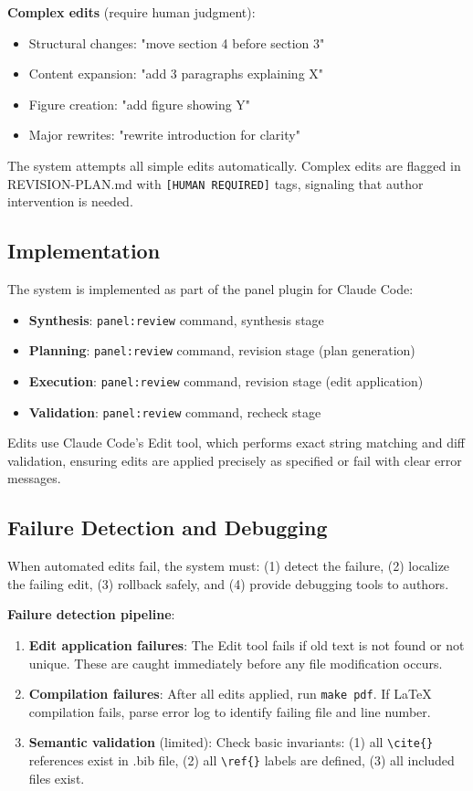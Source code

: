 \textbf{Complex edits} (require human judgment):
\begin{itemize}
\item Structural changes: "move section 4 before section 3"
\item Content expansion: "add 3 paragraphs explaining X"
\item Figure creation: "add figure showing Y"
\item Major rewrites: "rewrite introduction for clarity"
\end{itemize}

The system attempts all simple edits automatically. Complex edits are flagged in REVISION-PLAN.md with \texttt{[HUMAN REQUIRED]} tags, signaling that author intervention is needed.

\subsection{Implementation}

The system is implemented as part of the panel plugin for Claude Code:

\begin{itemize}
\item \textbf{Synthesis}: \texttt{panel:review} command, synthesis stage
\item \textbf{Planning}: \texttt{panel:review} command, revision stage (plan generation)
\item \textbf{Execution}: \texttt{panel:review} command, revision stage (edit application)
\item \textbf{Validation}: \texttt{panel:review} command, recheck stage
\end{itemize}

Edits use Claude Code's Edit tool, which performs exact string matching and diff validation, ensuring edits are applied precisely as specified or fail with clear error messages.

\subsection{Failure Detection and Debugging}

When automated edits fail, the system must: (1) detect the failure, (2) localize the failing edit, (3) rollback safely, and (4) provide debugging tools to authors.

\textbf{Failure detection pipeline}:
\begin{enumerate}
\item \textbf{Edit application failures}: The Edit tool fails if old text is not found or not unique. These are caught immediately before any file modification occurs.
\item \textbf{Compilation failures}: After all edits applied, run \texttt{make pdf}. If LaTeX compilation fails, parse error log to identify failing file and line number.
\item \textbf{Semantic validation} (limited): Check basic invariants: (1) all \texttt{\textbackslash{}cite\{\}} references exist in .bib file, (2) all \texttt{\textbackslash{}ref\{\}} labels are defined, (3) all included files exist.
\end{enumerate}

